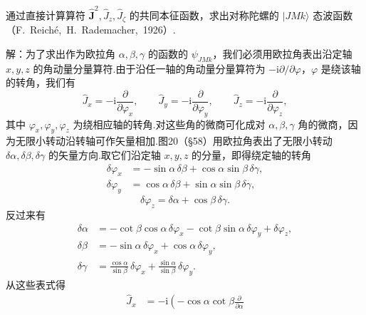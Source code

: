 \begin{xiti}
\setcounter{equation}{0}%

\quad 通过直接计算算符 $\hat{\boldsymbol{J}}^2,\hat{J}_z,\hat{J}_\zeta$ 的共同本征函数，求出对称陀螺的 $|JMk\rangle$ 态波函数（F.~Reich\'e,~H.~Rademacher,~1926）.

解：为了求出作为欧拉角 $\alpha,\beta,\gamma$ 的函数的 $\psi_{JMk}$，我们必须用欧拉角表出沿定轴 $x,y,z$ 的角动量分量算符.由于沿任一轴的角动量分量算符为 $-\mathrm{i}\partial/\partial\varphi$，$\varphi$ 是绕该轴的转角，我们有
\begin{equation*}
  \hat{J}_x=-\mathrm{i}\frac{\partial}{\partial\varphi_x},\qquad
  \hat{J}_y=-\mathrm{i}\frac{\partial}{\partial\varphi_y},\qquad
  \hat{J}_z=-\mathrm{i}\frac{\partial}{\partial\varphi_z},
\end{equation*}
其中 $\varphi_x,\varphi_y,\varphi_z$ 为绕相应轴的转角.对这些角的微商可化成对 $\alpha,\beta,\gamma$ 角的微商，因为无限小转动沿转轴可作矢量相加.图20（§58）用欧拉角表出了无限小转动 $\delta\alpha,\delta\beta,\delta\gamma$ 的矢量方向.取它们沿定轴 $x,y,z$ 的分量，即得绕定轴的转角
\begin{equation*}
\begin{aligned}
  \delta\varphi_x&=-\sin\alpha\,\delta\beta+\cos\alpha\sin\beta\,\delta\gamma,\\
  \delta\varphi_y&=\cos\alpha\,\delta\beta+\sin\alpha\sin\beta\,\delta\gamma,
\end{aligned}
\end{equation*}
\begin{equation*}
  \delta\varphi_z=\delta\alpha+\cos\beta\,\delta\gamma.
\end{equation*}
反过来有
\begin{equation*}
\begin{aligned}
  \delta\alpha&=-\cot\beta\cos\alpha\,\delta\varphi_x
  -\cot\beta\sin\alpha\,\delta\varphi_y+\delta\varphi_z,\\
  \delta\beta&=-\sin\alpha\,\delta\varphi_x+\cos\alpha\,\delta\varphi_y,\\
  \delta\gamma&=\frac{\cos\alpha}{\sin\beta}\,\delta\varphi_x
  +\frac{\sin\alpha}{\sin\beta}\,\delta\varphi_y.
\end{aligned}
\end{equation*}
从这些表式得
\begin{equation*}
\begin{aligned}
  \hat{J}_x&=-\mathrm{i}\left(-\cos\alpha\cot\beta\frac{\partial}{\partial\alpha}

\end{aligned}
\end{equation*}
\end{xiti}
